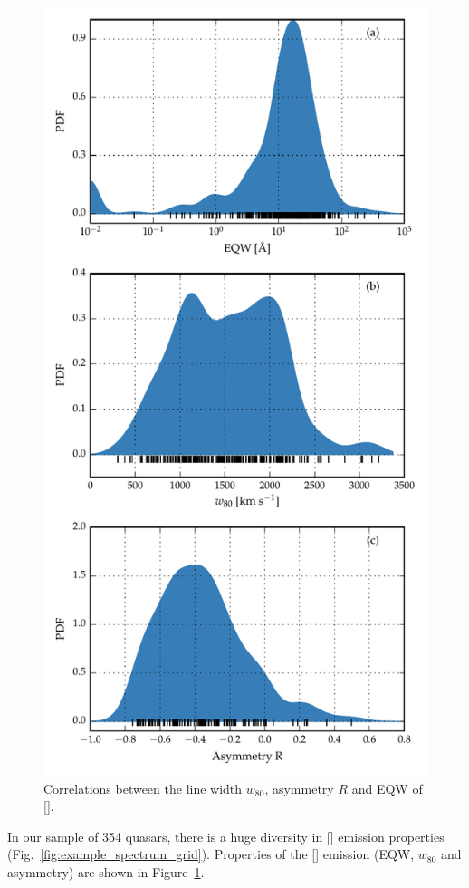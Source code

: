 \begin{figure}
    \includegraphics[width=0.8\columnwidth]{figures/chapter04/parameter_hists.pdf} 
    \caption[{Correlations between the line width $w_{80}$, asymmetry $R$ and EQW of [].}]{Correlations between the line width $w_{80}$, asymmetry $R$ and EQW of [].}     
    \label{fig:parameter_hists}
\end{figure}

In our sample of 354 quasars, there is a huge diversity in [] emission properties (Fig.~\ref{fig:example_spectrum_grid}). 
Properties of the [] emission (EQW, $w_{80}$ and asymmetry) are shown in Figure~\ref{fig:parameter_hists}. 

